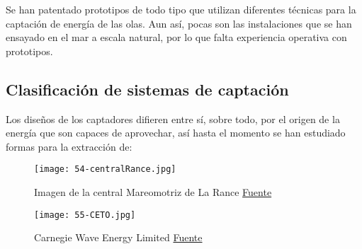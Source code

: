Se han patentado prototipos de todo tipo que utilizan diferentes
técnicas para la captación de energía de las olas. Aun así, pocas son
las instalaciones que se han ensayado en el mar a escala natural, por lo
que falta experiencia operativa con prototipos.

\subsection{Clasificación de sistemas de captación}\label{header-n44}

Los diseños de los captadores difieren entre sí, sobre todo, por el
origen de la energía que son capaces de aprovechar, así hasta el momento
se han estudiado formas para la extracción de:

\begin{figure}[hb]
\centering
\texttt{[image: 54-centralRance.jpg]}
\caption[Central Mareomotriz de La Rance]{Imagen de la central Mareomotriz de La Rance \href{http://ireneu.blogspot.com.es/2014/07/la-ecologica-y-desastrosa-central.html}{Fuente}}
\label{fig:centralRance}
\end{figure}

\begin{figure}
\centering
\texttt{[image: 55-CETO.jpg]}
\caption[Carnegie Wave Energy Limited]{Carnegie Wave Energy Limited \href{https://commons.wikimedia.org/w/index.php?curid=31753495}{Fuente}}
\label{fig:CETO}
\end{figure}


